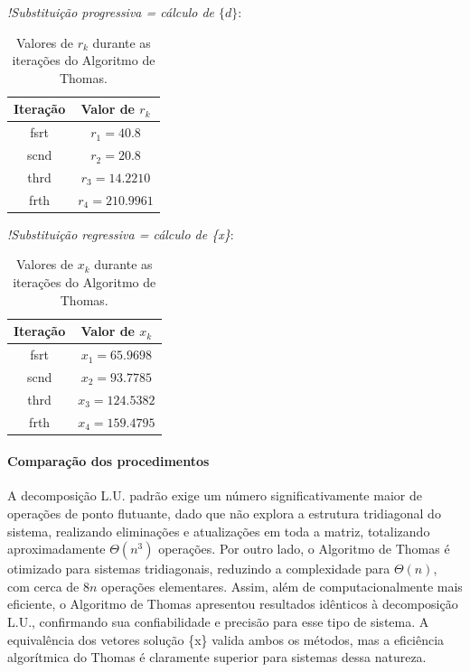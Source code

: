 \documentclass[12pt]{article}
\begin{document}
\textit{!Substituição progressiva = cálculo de $\{d\}$}:

\begin{table}[H]
\centering
\begin{tabular}{|c|c|}
\hline
\textbf{Iteração} & \textbf{Valor de $r_k$} \\
\hline
fsrt & $r_1 = 40.8$ \\
scnd & $r_2 = 20.8$ \\
thrd & $r_3 = 14.2210$ \\
frth & $r_4 = 210.9961$ \\
\hline
\end{tabular}
\caption{Valores de $r_k$ durante as iterações do Algoritmo de Thomas.}
\label{tab:thomas_r_values}
\end{table}

\newpage
\textit{!Substituição regressiva = cálculo de \{x\}}:

\begin{table}[H]
\centering
\begin{tabular}{|c|c|}
\hline
\textbf{Iteração} & \textbf{Valor de $x_k$} \\
\hline
fsrt & $x_1 = 65.9698$ \\
scnd & $x_2 = 93.7785$ \\
thrd & $x_3 = 124.5382$ \\
frth & $x_4 = 159.4795$ \\
\hline
\end{tabular}
\caption{Valores de $x_k$ durante as iterações do Algoritmo de Thomas.}
\label{tab:thomas_x_values}
\end{table}

\paragraph{Comparação dos procedimentos}

A decomposição L.U. padrão exige um número significativamente maior de operações de ponto flutuante, dado que não explora a estrutura tridiagonal do sistema, realizando eliminações e atualizações em toda a matriz, totalizando aproximadamente \(\Theta(n^3)\) operações. Por outro lado, o Algoritmo de Thomas é otimizado para sistemas tridiagonais, reduzindo a complexidade para \(\Theta(n)\), com cerca de \(8n\) operações elementares. Assim, além de computacionalmente mais eficiente, o Algoritmo de Thomas apresentou resultados idênticos à decomposição L.U., confirmando sua confiabilidade e precisão para esse tipo de sistema. A equivalência dos vetores solução \{x\} valida ambos os métodos, mas a eficiência algorítmica do Thomas é claramente superior para sistemas dessa natureza.
\end{document}
